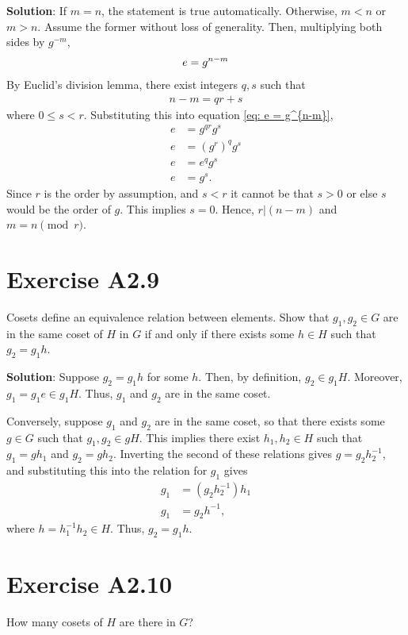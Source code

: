 \documentclass{book}
\begin{document}
    \textbf{Solution}: If $m=n$, the statement is true automatically. Otherwise, $m<n$ or $m>n$. Assume the former without loss of generality. Then, multiplying both sides by $g^{-m}$,
    \begin{align} \label{eq: e = g^{n-m}}
        e = g^{n-m}
    \end{align}
    By Euclid's division lemma, there exist integers $q, s$ such that
    \begin{align}
        n-m = qr + s
    \end{align}
    where $0\leq s < r$. Substituting this into equation \eqref{eq: e = g^{n-m}},
    \begin{align}
        e &= g^{qr}g^s \\
        e &= (g^r)^q g^s \\
        e &= e^q g^s \\
        e &= g^s.
    \end{align}
    Since $r$ is the order by assumption, and $s <r$ it cannot be that $s>0$ or else $s$ would be the order of $g$. This implies $s=0$. Hence, $r|(n-m)$ and $m = n \pmod r$.

\section*{Exercise A2.9}
    Cosets define an equivalence relation between elements. Show that $g_1, g_2 \in G$ are in the same coset of $H$ in $G$ if and only if there exists some $h\in H$ such that $g_2 = g_1 h$.
    
    \textbf{Solution}: Suppose $g_2 = g_1 h$ for some $h$. Then, by definition, $g_2 \in g_1 H$. Moreover, $g_1 = g_1 e \in g_1 H$. Thus, $g_1$ and $g_2$ are in the same coset.
    
    Conversely, suppose $g_1$ and $g_2$ are in the same coset, so that there exists some $g\in G$ such that $g_1, g_2 \in gH$. This implies there exist $h_1, h_2 \in H$ such that $g_1 = g h_1$ and $g_2 = g h_2$. Inverting the second of these relations gives $g = g_2 h_2^{-1}$, and substituting this into the relation for $g_1$ gives
    \begin{align}
        g_1 &= (g_2 h_2^{-1})h_1 \\
        g_1 &= g_2 h^{-1},
    \end{align}
    where $h = h_1^{-1}h_2\in H$. Thus, $g_2 = g_1 h$.
    
\section*{Exercise A2.10}
    How many cosets of $H$ are there in $G$?
    
\end{document}
